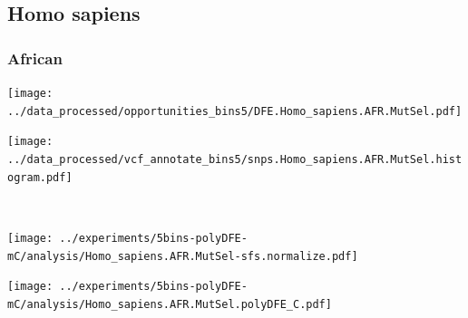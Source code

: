 \subsection{Homo sapiens}

\subsubsection{African}

\begin{minipage}{0.49\linewidth}
    \texttt{[image: ../data\_processed/opportunities\_bins5/DFE.Homo\_sapiens.AFR.MutSel.pdf]}
\end{minipage}
\begin{minipage}{0.49\linewidth}
    \texttt{[image: ../data\_processed/vcf\_annotate\_bins5/snps.Homo\_sapiens.AFR.MutSel.histogram.pdf]}
\end{minipage}
\\
\begin{minipage}{0.49\linewidth}
    \texttt{[image: ../experiments/5bins-polyDFE-mC/analysis/Homo\_sapiens.AFR.MutSel-sfs.normalize.pdf]}
\end{minipage}
\begin{minipage}{0.4\linewidth}
    \texttt{[image: ../experiments/5bins-polyDFE-mC/analysis/Homo\_sapiens.AFR.MutSel.polyDFE\_C.pdf]}
\end{minipage}
